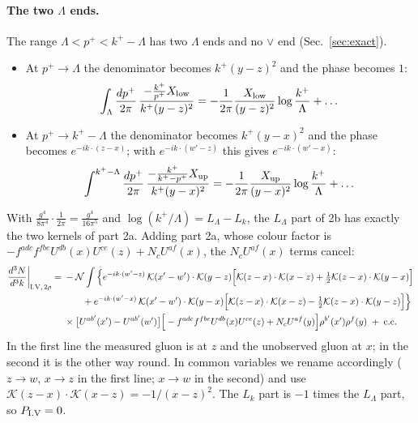 \documentclass[10pt]{article}
\numberwithin{equation}{section}
\newcommand{\KK}{\mathcal K}
\newcommand{\NN}{\mathcal N}
\newcommand{\LL}{L_\Lambda}
\newcommand{\Lk}{L_k}
\begin{document}
\paragraph{The two $\Lambda$ ends.} The range $\Lambda<p^+<k^+-\Lambda$ has two $\Lambda$ ends and no $\vee$ end (Sec.~\ref{sec:exact}).
\begin{itemize}
\item At $p^+\to\Lambda$ the denominator becomes $k^+(y-z)^2$ and the phase becomes $1$:
\begin{equation}
\int_\Lambda\frac{dp^+}{2\pi}\,\frac{-\frac{k^+}{p^+}X_{\rm low}}{k^+(y-z)^2}=-\frac{1}{2\pi}\frac{X_{\rm low}}{(y-z)^2}\log\frac{k^+}{\Lambda}+\dots
\end{equation}
\item At $p^+\to k^+-\Lambda$ the denominator becomes $k^+(y-x)^2$ and the phase becomes $e^{-ik\cdot(z-x)}$; with $e^{-ik\cdot(w'-z)}$ this gives $e^{-ik\cdot(w'-x)}$:
\begin{equation}
\int^{k^+-\Lambda}\frac{dp^+}{2\pi}\,\frac{-\frac{k^+}{k^+-p^+}X_{\rm up}}{k^+(y-x)^2}=-\frac1{2\pi}\frac{X_{\rm up}}{(y-x)^2}\log\frac{k^+}{\Lambda}+\dots
\end{equation}
\end{itemize}
With $\frac{g^4}{8\pi^4}\cdot\frac1{2\pi}=\frac{g^4}{16\pi^5}$ and $\log(k^+/\Lambda)=\LL-\Lk$, the $\LL$ part of 2b has exactly the two kernels of part 2a. Adding part 2a, whose colour factor is $-f^{adc}f^{fbe}U^{db}(x)U^{ce}(z)+N_cU^{af}(x)$, the $N_cU^{af}(x)$ terms cancel:
\begin{align}
\frac{d^3N}{d^3k}\bigg|_{\rm I.V,\,2\rho}={}&-\NN\int\Big\{e^{-ik\cdot(w'-z)}\,\KK(x'-w')\cdot\KK(y-z)\Big[\KK(z-x)\cdot\KK(x-z)+\tfrac12\KK(z-x)\cdot\KK(y-x)\Big]\notag\\
&\qquad+e^{-ik\cdot(w'-x)}\,\KK(x'-w')\cdot\KK(y-x)\Big[\KK(z-x)\cdot\KK(x-z)-\tfrac12\KK(z-x)\cdot\KK(y-z)\Big]\Big\}\notag\\
&\times\big[U^{ab'}(x')-U^{ab'}(w')\big]\Big[-f^{adc}f^{fbe}U^{db}(x)U^{ce}(z)+N_cU^{af}(y)\Big]\rho^{b'}(x')\rho^f(y)\;+\;{\rm c.c.}
\label{eq:rowV}
\end{align}
In the first line the measured gluon is at $z$ and the unobserved gluon at $x$; in the second it is the other way round. In common variables we rename accordingly ($z\to w$, $x\to z$ in the first line; $x\to w$ in the second) and use $\KK(z-x)\cdot\KK(x-z)=-1/(x-z)^2$. The $\Lk$ part is $-1$ times the $\LL$ part, so $P_{\rm I.V}=0$.
\end{document}
